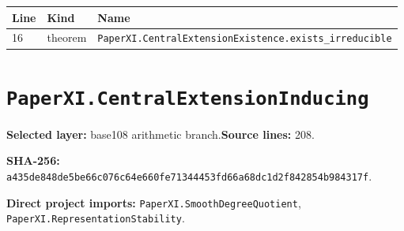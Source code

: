 \documentclass[10pt,oneside]{book}
\begin{document}
\begin{longtable}{@{}p{}p{}p{}@{}}\toprule Line&Kind&Name\\\midrule\endhead

16&theorem&\nolinkurl{PaperXI.CentralExtensionExistence.exists_irreducible}\\

\bottomrule\end{longtable}

\section{\texorpdfstring{\nolinkurl{PaperXI.CentralExtensionInducing}}{PaperXI.CentralExtensionInducing}}\label{module:PaperXI.CentralExtensionInducing}

\textbf{Selected layer:} base108 arithmetic branch.\quad\textbf{Source lines:} 208.\par\textbf{SHA-256:} {\scriptsize\nolinkurl{a435de848de5be66c076c64e660fe71344453fd66a68dc1d2f842854b984317f}}.


\textbf{Direct project imports:} \nolinkurl{PaperXI.SmoothDegreeQuotient}, \nolinkurl{PaperXI.RepresentationStability}.
\end{document}

